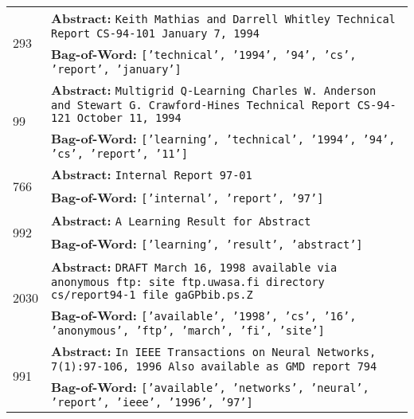 \begin{table}[!h]
{\begin{tabular}{p{1cm} p{12cm}}
             \midrule
             
             \multirow{2}{*}{293} & \textbf{Abstract:} {\tt Keith Mathias and Darrell Whitley Technical Report CS-94-101 January 7, 1994} \\
             & \textbf{Bag-of-Word:} {\tt ['technical', '1994', '94', 'cs', 'report', 'january']} \\
             
             \midrule
             
             \multirow{2}{*}{99} & \textbf{Abstract:} {\tt Multigrid Q-Learning Charles W. Anderson and Stewart G. Crawford-Hines Technical Report CS-94-121 October 11, 1994} \\
             & \textbf{Bag-of-Word:} {\tt ['learning', 'technical', '1994', '94', 'cs', 'report', '11']} \\
             
             \midrule
             
             \multirow{2}{*}{766} & \textbf{Abstract:} {\tt Internal Report 97-01} \\
             & \textbf{Bag-of-Word:} {\tt ['internal', 'report', '97']} \\
             
             \midrule
             
             \multirow{2}{*}{992} &  \textbf{Abstract:} {\tt A Learning Result for Abstract} \\
             & \textbf{Bag-of-Word:} {\tt ['learning', 'result', 'abstract']} \\
             
             \midrule
             
             \multirow{2}{*}{2030} &  \textbf{Abstract:} {\tt DRAFT March 16, 1998 available via anonymous ftp: site ftp.uwasa.fi directory cs/report94-1 file gaGPbib.ps.Z} \\
             & \textbf{Bag-of-Word:} {\tt ['available', '1998', 'cs', '16', 'anonymous', 'ftp', 'march', 'fi', 'site']} \\
             
             \midrule
             
             \multirow{2}{*}{991} &  \textbf{Abstract:} {\tt In IEEE Transactions on Neural Networks, 7(1):97-106, 1996 Also available as GMD report 794} \\
             & \textbf{Bag-of-Word: } {\tt ['available', 'networks', 'neural', 'report', 'ieee', '1996', '97']} \\
             

\end{tabular}}
\end{table}
